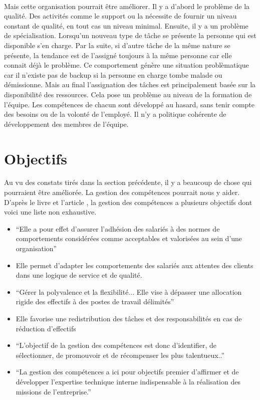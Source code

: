 \paragraph{}Mais cette organisation pourrait être améliorer. Il y a d'abord le problème de la qualité. Des activités comme le support ou la nécessite de fournir un niveau constant de qualité, en tout cas un niveau minimal. Ensuite, il y a un problème de spécialisation. Lorsqu'un nouveau type de tâche se présente la personne qui est disponible s'en charge. Par la suite, si d'autre tâche de la même nature se présente, la tendance est de l'assigné toujours à la même personne car elle connait déjà le problème. Ce comportement génère une situation problèmatique car il n'existe pas de backup si la personne en charge tombe malade ou démissionne. 
Mais au final l'assignation des tâches est principalement basée sur la disponibilité des ressources. Cela pose un problème au niveau de la formation de l'équipe. Les compétences de chacun sont développé au hasard, sans tenir compte des besoins ou de la volonté de l'employé. Il n'y a politique cohérente de développement des membres de l'équipe. 



\section{Objectifs}
Au vu des constats tirés dans la section précédente, il y a beaucoup de chose qui pourraient être améliorée. La gestion des compétences pourrait nous y aider. D'après le livre\citep{gestionressourceshumaine2007} et l'article \citep{delobbe}, la gestion des compétences a plusieurs objectifs dont voici une liste non exhaustive.
\begin{itemize}
    \item \enquote{Elle a pour effet d'assurer l'adhésion des salariés à des normes de comportements considérées comme acceptables et valorisées au sein d'une organisation}\citep[p.40]{delobbe}
    \item Elle permet d'adapter les comportements des salariés aux attentes des clients dans une logique de service et de qualité. \citep[182]{gestionressourceshumaine2007}
    \item \enquote{Gérer la polyvalence et la flexibilité... Elle vise à dépasser une allocation rigide des effectifs à des postes de travail délimités}\citep[p.41]{delobbe}
    \item Elle favorise une redistribution des tâches et des responsabilités en cas de réduction d'effectifs \citep[182]{gestionressourceshumaine2007}
    \item  \enquote{L'objectif de la gestion des compétences est donc d'identifier, de sélectionner, de promouvoir et de récompenser les plus talentueux..}\citep[p.43]{delobbe}
    \item  \enquote{La gestion des compétences a ici pour objectifs premier d'affirmer et de développer l'expertise technique interne indispensable à la réalisation des missions de l'entreprise.} \citep[p.45]{delobbe}

\end{itemize}
           
